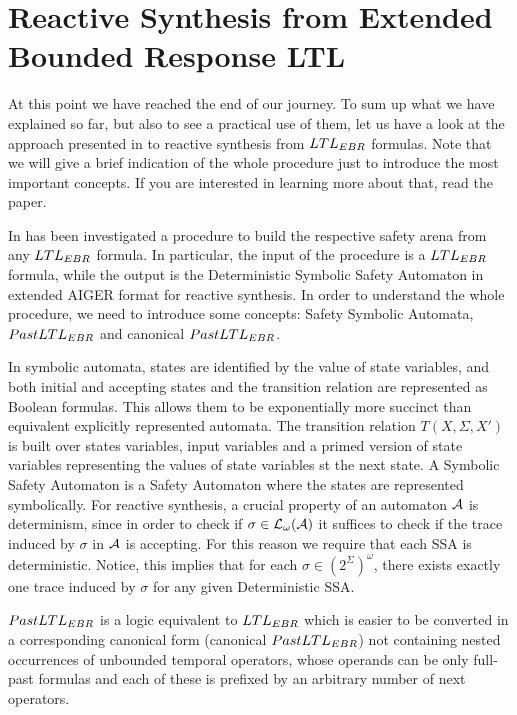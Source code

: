 
\section{Reactive Synthesis from Extended Bounded Response LTL}
\label{sec:ebr-ltl-synthesis}

At this point we have reached the end of our journey. To sum up what we have explained so far, but also to see a practical use of them, let us have a look at the approach presented in \cite{geatti-2020-08} to reactive synthesis from $LTL_{EBR}$ formulas. Note that we will give a brief indication of the whole procedure just to introduce the most important concepts. If you are interested in learning more about that, read the paper.

In \cite{geatti-2020-08} has been investigated a procedure to build the respective safety arena from any $LTL_{EBR}$ formula.
In particular, the input of the procedure is a $LTL_{EBR}$ formula, while the output is the Deterministic Symbolic Safety Automaton in extended AIGER format for reactive synthesis. In order to understand the whole procedure, we need to introduce some concepts: Safety Symbolic Automata, $PastLTL_{EBR}$ and canonical $PastLTL_{EBR}$.

In symbolic automata, states are identified by the value of state variables, and both initial and accepting states and the transition relation are represented as Boolean formulas. This allows them to be exponentially more succinct than equivalent explicitly represented automata. The transition relation $T(X,\Sigma,X')$ is built over states variables, input variables and a primed version of state variables representing the values of state variables st the next state.
A Symbolic Safety Automaton is a Safety Automaton where the states are represented symbolically.
For reactive synthesis, a crucial property of an automaton $\mathcal{A}$ is determinism, since in order to check if $\sigma \in \mathcal{L}{}_\omega{(\mathcal{A})}$ it suffices to check if the trace induced by $\sigma$ in $\mathcal{A}$ is accepting. For this reason we require that each SSA is deterministic.
Notice, this implies that for each $\sigma \in (2^\Sigma)^\omega$, there exists exactly one trace induced by $\sigma$ for any given Deterministic SSA. 

$PastLTL_{EBR}$ is a logic equivalent to $LTL_{EBR}$ which is easier to be converted in a corresponding canonical form (canonical $PastLTL_{EBR}$) not containing nested occurrences of unbounded temporal operators, whose operands can be only full-past formulas and each of these is prefixed by an arbitrary number of next operators.

